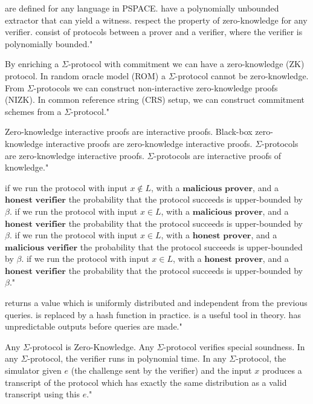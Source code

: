 {are defined for any language in \textrm{PSPACE}.}
{have a polynomially unbounded extractor that can yield a witness.}
{respect the property of zero-knowledge for any verifier.}
{consist of protocols between a prover and a verifier, where the verifier is polynomially bounded."}

{By enriching a $\Sigma$-protocol with commitment we can have a zero-knowledge (ZK) protocol.}
{In random oracle model (ROM) a $\Sigma$-protocol cannot be zero-knowledge.}
{From $\Sigma$-protocols we can construct non-interactive zero-knowledge proofs (NIZK).}
{In common reference string (CRS) setup, we can construct commitment schemes from a $\Sigma$-protocol."}

{Zero-knowledge interactive proofs are interactive proofs.}
{Black-box zero-knowledge interactive proofs are zero-knowledge interactive proofs.}
{$\Sigma$-protocols are zero-knowledge interactive proofs.}
{$\Sigma$-protocols are interactive proofs of knowledge."}

{if we run the protocol with input $x\not\in L$, with a $ \textbf{malicious prover} $, and a $ \textbf{honest verifier} $ the probability that the protocol succeeds is upper-bounded by $\beta$.}
{if we run the protocol with input $x\in L$, with a $ \textbf{malicious prover} $, and a $ \textbf{honest verifier} $ the probability that the protocol succeeds is upper-bounded by $\beta$.}
{if we run the protocol with input $x\in L$, with a $ \textbf{honest prover} $, and a $ \textbf{malicious verifier} $ the probability that the protocol succeeds is upper-bounded by $\beta$.}
{if we run the protocol with input $x\in L$, with a $ \textbf{honest prover} $, and a $ \textbf{honest verifier} $ the probability that the protocol succeeds is upper-bounded by $\beta$."}

{returns a value which is uniformly distributed and independent from the previous queries.}
{is replaced by a hash function in practice.}
{is a useful tool in theory.}
{has unpredictable outputs before queries are made."}

{Any $\Sigma$-protocol is Zero-Knowledge.}
{Any $\Sigma$-protocol verifies special soundness.}
{In any $\Sigma$-protocol, the verifier runs in polynomial time.}
{In any $\Sigma$-protocol, the simulator given $e$ (the challenge sent by the verifier) and the input $x$ produces a transcript of the protocol which has exactly the same distribution as a valid transcript using this $e$."}


